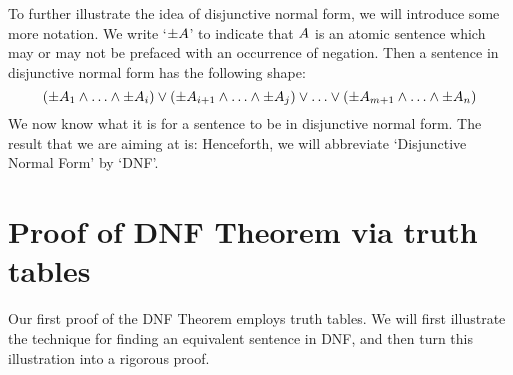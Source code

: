 To further illustrate the idea of disjunctive normal form, we will introduce some more notation. We write `$\pm A$' to indicate that $A$ is an atomic sentence which may or may not be prefaced with an occurrence of negation. Then a sentence in disjunctive normal form has the following shape:
	$$(\pm A_1 \land \ldots \land \pm A_i) \lor (\pm A_{i+1} \land \ldots \land \pm A_j) \lor \ldots \lor (\pm A_{m+1} \land \ldots \land \pm A_n)$$
We now know what it is for a sentence to be in disjunctive normal form. The result that we are aiming at is:
Henceforth, we will abbreviate `Disjunctive Normal Form' by `DNF'.


\section{Proof of DNF Theorem via truth tables}
\label{s:DNFTruthTable}

Our first proof of the DNF Theorem employs truth tables. We will first illustrate the technique for finding an equivalent sentence in DNF, and then turn this illustration into a rigorous proof.

